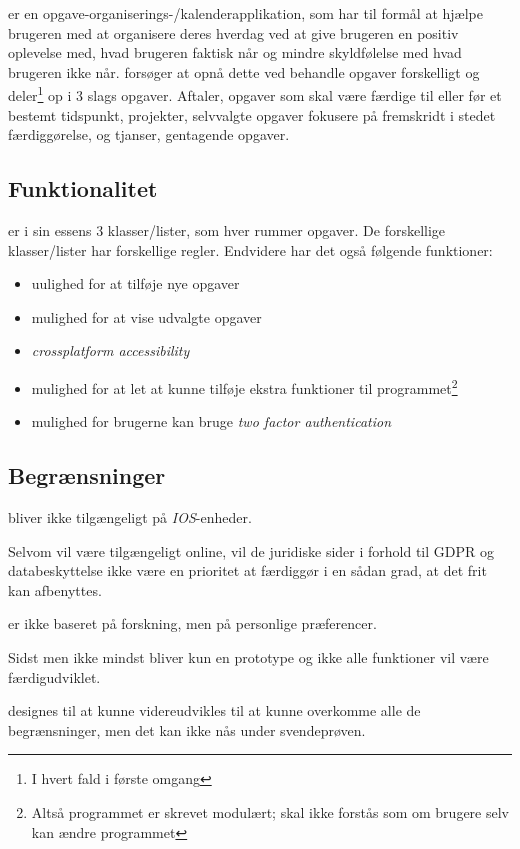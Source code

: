 \documentclass{report}
\begin{document}
\projectName{} er en opgave-organiserings-/kalenderapplikation, som har til formål at hjælpe brugeren med at organisere deres hverdag ved at give brugeren en positiv oplevelse med, hvad brugeren faktisk når og mindre skyldfølelse med hvad brugeren ikke når. \projectName{} forsøger at opnå dette ved behandle opgaver forskelligt og deler\footnote{I hvert fald i første omgang} op i 3 slags opgaver. Aftaler, opgaver som skal være færdige til eller før et bestemt tidspunkt, projekter, selvvalgte opgaver fokusere på fremskridt i stedet færdiggørelse, og tjanser, gentagende opgaver.

\subsection{Funktionalitet}

\projectName{} er i sin essens 3 klasser/lister, som hver rummer opgaver. De forskellige klasser/lister har forskellige regler. Endvidere har det også følgende funktioner:
\begin{itemize}
\item uulighed for at tilføje nye opgaver
\item mulighed for at vise udvalgte opgaver
\item \textit{crossplatform accessibility}
\item mulighed for at let at kunne tilføje ekstra funktioner til programmet\footnote{Altså programmet er skrevet modulært; skal ikke forstås som om brugere selv kan ændre programmet}
\item mulighed for brugerne kan bruge \textit{two factor authentication}
\end{itemize}

\subsection{Begrænsninger}

\projectName{} bliver ikke tilgængeligt på \textit{IOS}-enheder.

Selvom \projectName{} vil være tilgængeligt online, vil de juridiske sider i forhold til GDPR og databeskyttelse ikke være en prioritet at færdiggør i en sådan grad, at det frit kan afbenyttes.

\projectName{} er ikke baseret på forskning, men på personlige præferencer.

Sidst men ikke mindst bliver \projectName{} kun en prototype og ikke alle funktioner vil være færdigudviklet.

\projectName{} designes til at kunne videreudvikles til at kunne overkomme alle de begrænsninger, men det kan ikke nås under svendeprøven.
\end{document}
